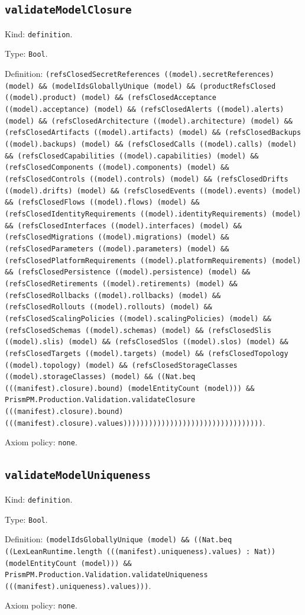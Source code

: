 \documentclass[11pt]{article}
\begin{document}
\subsection*{\texttt{validateModelClosure}}
\noindent Kind: \texttt{definition}.\par
\noindent Type: \texttt{Bool}.\par
\noindent Definition: \texttt{(refsClosedSecretReferences ((model).secretReferences) (model) \&\& (modelIdsGloballyUnique (model) \&\& (productRefsClosed ((model).product) (model) \&\& (refsClosedAcceptance ((model).acceptance) (model) \&\& (refsClosedAlerts ((model).alerts) (model) \&\& (refsClosedArchitecture ((model).architecture) (model) \&\& (refsClosedArtifacts ((model).artifacts) (model) \&\& (refsClosedBackups ((model).backups) (model) \&\& (refsClosedCalls ((model).calls) (model) \&\& (refsClosedCapabilities ((model).capabilities) (model) \&\& (refsClosedComponents ((model).components) (model) \&\& (refsClosedControls ((model).controls) (model) \&\& (refsClosedDrifts ((model).drifts) (model) \&\& (refsClosedEvents ((model).events) (model) \&\& (refsClosedFlows ((model).flows) (model) \&\& (refsClosedIdentityRequirements ((model).identityRequirements) (model) \&\& (refsClosedInterfaces ((model).interfaces) (model) \&\& (refsClosedMigrations ((model).migrations) (model) \&\& (refsClosedParameters ((model).parameters) (model) \&\& (refsClosedPlatformRequirements ((model).platformRequirements) (model) \&\& (refsClosedPersistence ((model).persistence) (model) \&\& (refsClosedRetirements ((model).retirements) (model) \&\& (refsClosedRollbacks ((model).rollbacks) (model) \&\& (refsClosedRollouts ((model).rollouts) (model) \&\& (refsClosedScalingPolicies ((model).scalingPolicies) (model) \&\& (refsClosedSchemas ((model).schemas) (model) \&\& (refsClosedSlis ((model).slis) (model) \&\& (refsClosedSlos ((model).slos) (model) \&\& (refsClosedTargets ((model).targets) (model) \&\& (refsClosedTopology ((model).topology) (model) \&\& (refsClosedStorageClasses ((model).storageClasses) (model) \&\& ((Nat.beq (((manifest).closure).bound) (modelEntityCount (model))) \&\& PrismPM.Production.Validation.validateClosure (((manifest).closure).bound) (((manifest).closure).values)))))))))))))))))))))))))))))))))}.\par
\noindent Axiom policy: \texttt{none}.\par
\subsection*{\texttt{validateModelUniqueness}}
\noindent Kind: \texttt{definition}.\par
\noindent Type: \texttt{Bool}.\par
\noindent Definition: \texttt{(modelIdsGloballyUnique (model) \&\& ((Nat.beq ((LexLeanRuntime.length (((manifest).uniqueness).values) : Nat)) (modelEntityCount (model))) \&\& PrismPM.Production.Validation.validateUniqueness (((manifest).uniqueness).values)))}.\par
\noindent Axiom policy: \texttt{none}.\par
\end{document}
